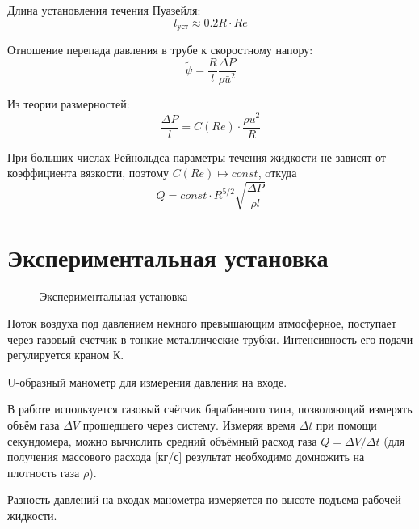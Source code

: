 \documentclass[a4paper, 12pt]{article}
\begin{document}
    Длина установления течения Пуазейля:
    \begin{equation}
        l_{уст} \approx 0.2R\cdot Re
    \end{equation}

    Отношение перепада давления в трубе к скоростному напору:
    \begin{equation}
        \tilde{\psi} = \frac{R}{l}\frac{\Delta P}{\rho \bar{u}^2}
    \end{equation}

    Из теории размерностей:
    \begin{equation}
        \frac{\Delta P}{l} = C(Re)\cdot \frac{\rho \bar{u}^2}{R}
    \end{equation}

    При больших числах Рейнольдса параметры течения жидкости не зависят от коэффициента вязкости, поэтому $C(Re)\mapsto const$, oткуда
    \begin{equation}
        Q = const \cdot R^{5/2} \sqrt{\frac{\Delta P}{\rho l}}
    \end{equation}


\section{Экспериментальная установка}
    \begin{figure}[!ht]
        \caption{Экспериментальная установка}
    \end{figure}
    Поток воздуха под давлением немного превышающим атмосферное, поступает через газовый счетчик в тонкие металлические трубки. Интенсивность его подачи регулируется краном К. \par 
    U-образный манометр для измерения давления на входе.
    
    В работе используется газовый счётчик барабанного
    типа, позволяющий измерять объём газа $\Delta V$ прошедшего через систему. Измеряя время $\Delta t$ при помощи секундомера, можно вычислить средний объёмный расход газа $Q = \Delta V/ \Delta t$ (для получения массового расхода [кг/с] результат
    необходимо домножить на плотность газа $\rho$). \par 
    Разность давлений на входах манометра измеряется по высоте подъема рабочей жидкости.
\end{document}
